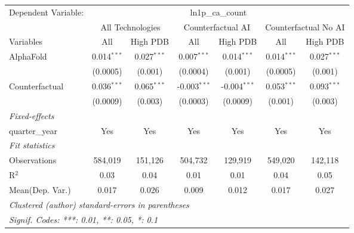 \begingroup
\centering
\begin{tabular}{lcccccc}
   \tabularnewline \midrule \midrule
   Dependent Variable: & \multicolumn{6}{c}{ln1p\_ca\_count}\\
 & \multicolumn{2}{c}{All Technologies} & \multicolumn{2}{c}{Counterfactual AI} & \multicolumn{2}{c}{Counterfactual No AI} \\
\cmidrule(lr){1-1}\cmidrule(lr){2-3} \cmidrule(lr){4-5} \cmidrule(lr){6-7}
Variables & \multicolumn{1}{c}{All} & \multicolumn{1}{c}{High PDB} & \multicolumn{1}{c}{All} & \multicolumn{1}{c}{High PDB} & \multicolumn{1}{c}{All} & \multicolumn{1}{c}{High PDB} \\
\cmidrule(lr){1-1}\cmidrule(lr){2-2} \cmidrule(lr){3-3} \cmidrule(lr){4-4} \cmidrule(lr){5-5} \cmidrule(lr){6-6} \cmidrule(lr){7-7}
   AlphaFold      & 0.014$^{***}$ & 0.027$^{***}$ & 0.007$^{***}$  & 0.014$^{***}$  & 0.014$^{***}$ & 0.027$^{***}$\\   
                  & (0.0005)      & (0.001)       & (0.0004)       & (0.001)        & (0.0005)      & (0.001)\\   
   Counterfactual & 0.036$^{***}$ & 0.065$^{***}$ & -0.003$^{***}$ & -0.004$^{***}$ & 0.053$^{***}$ & 0.093$^{***}$\\   
                  & (0.0009)      & (0.003)       & (0.0003)       & (0.0009)       & (0.001)       & (0.003)\\   
   \midrule
   \emph{Fixed-effects}\\
   quarter\_year  & Yes           & Yes           & Yes            & Yes            & Yes           & Yes\\  
   \midrule
   \emph{Fit statistics}\\
   Observations   & 584,019       & 151,126       & 504,732        & 129,919        & 549,020       & 142,118\\  
   R$^2$          & 0.03          & 0.04          & 0.01           & 0.01           & 0.04          & 0.05\\  
Mean(Dep. Var.) & 0.017 & 0.026 & 0.009 & 0.012 & 0.017 & 0.027 \\
   \midrule \midrule
   \multicolumn{7}{l}{\emph{Clustered (author) standard-errors in parentheses}}\\
   \multicolumn{7}{l}{\emph{Signif. Codes: ***: 0.01, **: 0.05, *: 0.1}}\\
\end{tabular}
\par\endgroup
